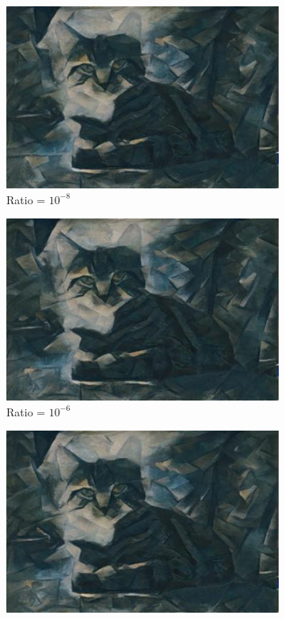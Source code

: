 \documentclass{article}
\begin{document}
\begin{figure}[H]
\begin{subfigure}{.5\textwidth}
  \centering
  \includegraphics[width=.8\linewidth]{cat_dark1e-07}
  \caption{Ratio = $10^{-8}$}
  \label{fig:sfig1}
\end{subfigure}
\begin{subfigure}{.5\textwidth}
  \centering
  \includegraphics[width=.8\linewidth]{cat_dark1e-05}
  \caption{Ratio = $10^{-6}$}
  \label{fig:sfig2}
\end{subfigure}
\begin{subfigure}{.5\textwidth}
  \centering
  \includegraphics[width=.8\linewidth]{cat_dark1e-04}

\end{subfigure}
\end{figure}
\end{document}

